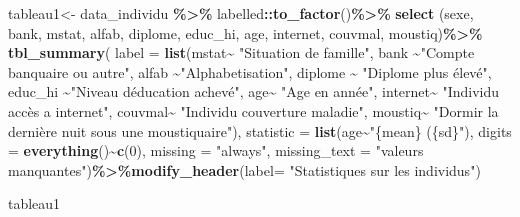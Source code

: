 \documentclass[
]{article}
\newenvironment{Shaded}{\begin{snugshade}}{\end{snugshade}}
\newcommand{\AttributeTok}[1]{\textcolor[rgb]{0.13,0.29,0.53}{#1}}
\newcommand{\DecValTok}[1]{\textcolor[rgb]{0.00,0.00,0.81}{#1}}
\newcommand{\FunctionTok}[1]{\textcolor[rgb]{0.13,0.29,0.53}{\textbf{#1}}}
\newcommand{\NormalTok}[1]{#1}
\newcommand{\OtherTok}[1]{\textcolor[rgb]{0.56,0.35,0.01}{#1}}
\newcommand{\SpecialCharTok}[1]{\textcolor[rgb]{0.81,0.36,0.00}{\textbf{#1}}}
\newcommand{\StringTok}[1]{\textcolor[rgb]{0.31,0.60,0.02}{#1}}
\begin{document}
\begin{Shaded}
\begin{Highlighting}[]
\NormalTok{tableau1}\OtherTok{\textless{}{-}}\NormalTok{ data\_individu }\SpecialCharTok{\%\textgreater{}\%}\NormalTok{ labelled}\SpecialCharTok{::}\FunctionTok{to\_factor}\NormalTok{()}\SpecialCharTok{\%\textgreater{}\%}
  \FunctionTok{select}\NormalTok{ (sexe, bank, mstat, alfab, diplome, educ\_hi, age, internet, couvmal, moustiq)}\SpecialCharTok{\%\textgreater{}\%} 
  \FunctionTok{tbl\_summary}\NormalTok{(}
    \AttributeTok{label =} \FunctionTok{list}\NormalTok{(mstat}\SpecialCharTok{\textasciitilde{}} \StringTok{"Situation de famille"}\NormalTok{,}
\NormalTok{                 bank }\SpecialCharTok{\textasciitilde{}}\StringTok{"Compte banquaire ou autre"}\NormalTok{,}
\NormalTok{               alfab }\SpecialCharTok{\textasciitilde{}}\StringTok{"Alphabetisation"}\NormalTok{,}
\NormalTok{               diplome }\SpecialCharTok{\textasciitilde{}} \StringTok{"Diplome plus élevé"}\NormalTok{,}
\NormalTok{               educ\_hi }\SpecialCharTok{\textasciitilde{}}\StringTok{"Niveau d\textquotesingle{}éducation achevé"}\NormalTok{, }
\NormalTok{               age}\SpecialCharTok{\textasciitilde{}} \StringTok{"Age en année"}\NormalTok{, }
\NormalTok{              internet}\SpecialCharTok{\textasciitilde{}} \StringTok{"Individu accès a internet"}\NormalTok{, }
\NormalTok{              couvmal}\SpecialCharTok{\textasciitilde{}} \StringTok{"Individu couverture maladie"}\NormalTok{,}
\NormalTok{              moustiq}\SpecialCharTok{\textasciitilde{}} \StringTok{"Dormir la dernière nuit sous une moustiquaire"}\NormalTok{),}
  \AttributeTok{statistic =} \FunctionTok{list}\NormalTok{(age}\SpecialCharTok{\textasciitilde{}}\StringTok{"\{mean\} (\{sd\}"}\NormalTok{),}
  \AttributeTok{digits =} \FunctionTok{everything}\NormalTok{()}\SpecialCharTok{\textasciitilde{}}\FunctionTok{c}\NormalTok{(}\DecValTok{0}\NormalTok{),}
  \AttributeTok{missing =} \StringTok{"always"}\NormalTok{,}
  \AttributeTok{missing\_text =} \StringTok{"valeurs manquantes"}\NormalTok{)}\SpecialCharTok{\%\textgreater{}\%}\FunctionTok{modify\_header}\NormalTok{(}\AttributeTok{label=} \StringTok{"Statistiques sur les individus"}\NormalTok{)}

\NormalTok{tableau1}
\end{Highlighting}
\end{Shaded}
\end{document}

